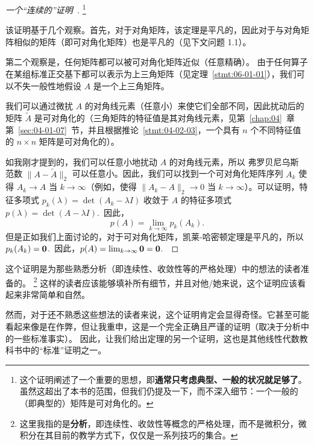 \begin{proof}[\normalfont\heiti 一个“连续的”证明~\nopunct]
\footnote{这个证明阐述了一个重要的思想，即\textbf{通常只考虑典型、一般的状况就足够了}。虽然这超出了本书的范围，但我们仍提及一下，而不深入细节：一个一般的（即典型的）矩阵是可对角化的。}

该证明基于几个观察。首先，对于对角矩阵，该定理是平凡的，因此对于与对角矩阵相似的矩阵（即可对角化矩阵）也是平凡的（见下文问题 1.1）。

第二个观察是，任何矩阵都可以被可对角化矩阵近似（任意精确）。
由于任何算子在某组标准正交基下都可以表示为上三角矩阵（见定理~\ref{stmt:06-01-01}），我们可以不失一般性地假设 $A$ 是一个上三角矩阵。

我们可以通过微扰 $A$ 的对角线元素（任意小）来使它们全部不同，因此扰动后的矩阵 $\widetilde{A}$ 是可对角化的（三角矩阵的特征值是其对角线元素，见第~\ref{chap:04}~章第~\ref{sec:04-01-07}~节，并且根据推论~\ref{stmt:04-02-03}，一个具有 $n$ 个不同特征值的 $n \times n$ 矩阵是可对角化的）。

如我刚才提到的，我们可以任意小地扰动 $A$ 的对角线元素，所以 弗罗贝尼乌斯 范数 $\|A - \widetilde{A}\|_2$ 可以任意小。因此，我们可以找到一个可对角化矩阵序列 $A_k$ 使得 $A_k \to A$ 当 $k \to \infty$（例如，使得 $\|A_k - A\|_2 \to 0$ 当 $k \to \infty$）。可以证明，特征多项式 $p_k(\lambda) = \det(A_k - \lambda I)$ 收敛于 $A$ 的特征多项式 $p(\lambda) = \det(A - \lambda I)$.~因此，$$p(A) = \lim_{k \to \infty} p_k(A_k).$$
但是正如我们上面讨论的，对于可对角化矩阵，凯莱-哈密顿定理是平凡的，所以 $p_k(A_k) = \mathbf{0}$.~因此，$p(A) = \lim_{k \to \infty} \mathbf{0} = \mathbf{0}$.~\end{proof}

这个证明是为那些熟悉分析（即连续性、收敛性等的严格处理）中的想法的读者准备的。
\footnote{这里我指的是\textbf{分析}，即连续性、收敛性等概念的严格处理，而不是微积分，微积分在其目前的教学方式下，仅仅是一系列技巧的集合。}
这样的读者应该能够填补所有细节，并且对他/她来说，这个证明应该看起来非常简单和自然。

然而，对于还不熟悉这些想法的读者来说，这个证明肯定会显得奇怪。它甚至可能看起来像是在作弊，但让我重申，这是一个完全正确且严谨的证明（取决于分析中的一些标准事实）。
因此，让我们给出定理的另一个证明，这也是其他线性代数教科书中的“标准”证明之一。


